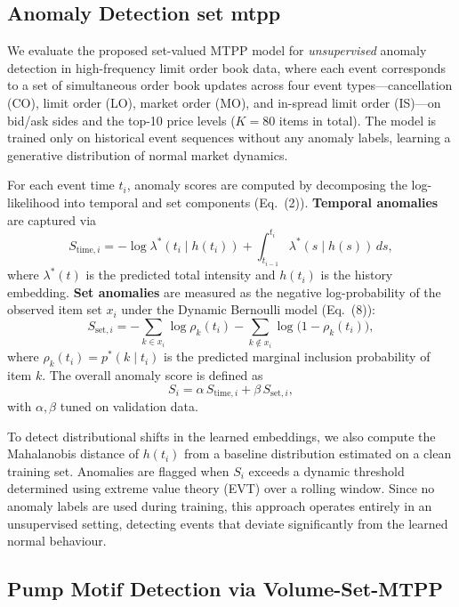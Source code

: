 
\subsection{Anomaly Detection set mtpp}
We evaluate the proposed set-valued MTPP model for \emph{unsupervised} anomaly detection in high-frequency limit order book data, where each event corresponds to a set of simultaneous order book updates across four event types—cancellation (CO), limit order (LO), market order (MO), and in-spread limit order (IS)—on bid/ask sides and the top-10 price levels ($K = 80$ items in total). The model is trained only on historical event sequences without any anomaly labels, learning a generative distribution of normal market dynamics.

For each event time $t_i$, anomaly scores are computed by decomposing the log-likelihood into temporal and set components (Eq.~(2)). \textbf{Temporal anomalies} are captured via
\begin{equation}
S_{\mathrm{time},i} = -\log \lambda^*(t_i \mid h(t_i)) + \int_{t_{i-1}}^{t_i} \lambda^*(s \mid h(s))\,ds,
\end{equation}
where $\lambda^*(t)$ is the predicted total intensity and $h(t_i)$ is the history embedding. \textbf{Set anomalies} are measured as the negative log-probability of the observed item set $x_i$ under the Dynamic Bernoulli model (Eq.~(8)):
\begin{equation}
S_{\mathrm{set},i} = -\sum_{k \in x_i} \log \rho_k(t_i) - \sum_{k \notin x_i} \log \big( 1 - \rho_k(t_i) \big),
\end{equation}
where $\rho_k(t_i) = p^*(k \mid t_i)$ is the predicted marginal inclusion probability of item $k$. The overall anomaly score is defined as
\begin{equation}
S_i = \alpha \, S_{\mathrm{time},i} + \beta \, S_{\mathrm{set},i},
\end{equation}
with $\alpha,\beta$ tuned on validation data.

To detect distributional shifts in the learned embeddings, we also compute the Mahalanobis distance of $h(t_i)$ from a baseline distribution estimated on a clean training set. Anomalies are flagged when $S_i$ exceeds a dynamic threshold determined using extreme value theory (EVT) over a rolling window. Since no anomaly labels are used during training, this approach operates entirely in an unsupervised setting, detecting events that deviate significantly from the learned normal behaviour.


\subsection{Pump Motif Detection via Volume-Set-MTPP}
\label{subsec:pump-mtpp}


